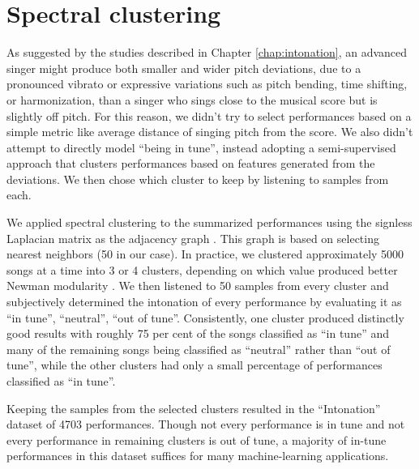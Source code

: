 \section{Spectral clustering}
As suggested by the studies described in Chapter \ref{chap:intonation}, an advanced singer might produce both smaller and wider pitch deviations, due to a pronounced vibrato or expressive variations such as pitch bending, time shifting, or harmonization, than a singer who sings close to the musical score but is slightly off pitch. For this reason, we didn't try to select performances based on a simple metric like average distance of singing pitch from the score. We also didn't attempt to directly model ``being in tune'', instead adopting a semi-supervised approach that clusters performances based on features generated from the deviations. We then chose which cluster to keep by listening to samples from each.

We applied spectral clustering to the summarized performances using the signless Laplacian matrix as the adjacency graph \cite{lucinska2012spectral}. This graph is based on selecting nearest neighbors (50 in our case). In practice, we clustered approximately 5000 songs at a time into 3 or 4 clusters, depending on which value produced better Newman modularity \cite{newman2006modularity}. We then listened to 50 samples from every cluster and subjectively determined the intonation of every performance by evaluating it as ``in tune'', ``neutral'', ``out of tune''. Consistently, one cluster produced distinctly good results with roughly 75 per cent of the songs classified as ``in tune'' and many of the remaining songs being classified as ``neutral'' rather than ``out of tune'', while the other clusters had only a small percentage of performances classified as ``in tune''. 

Keeping the samples from the selected clusters resulted in the ``Intonation'' dataset of 4703 performances. Though not every performance is in tune and not every performance in remaining clusters is out of tune, a majority of in-tune performances in this dataset suffices for many machine-learning applications.

